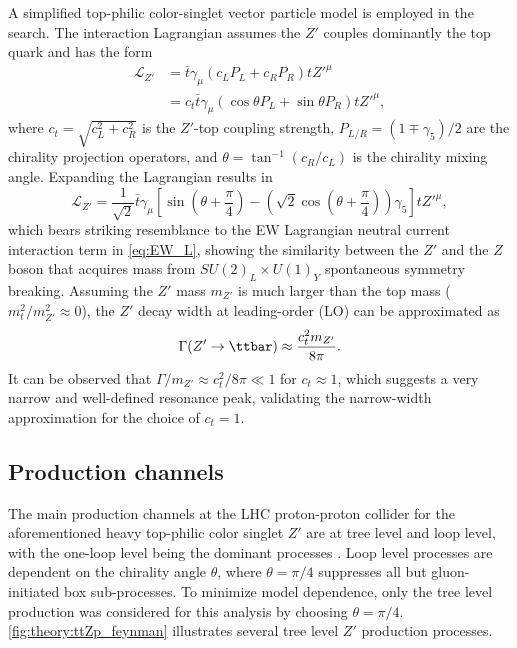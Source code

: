 \documentclass[../thesis.tex]{subfiles}
\begin{document}
A simplified top-philic color-singlet vector particle model \citep{theory:ttZp,theory:ttZp_LHC} is employed in the search. The interaction Lagrangian assumes the $Z'$ couples dominantly the top quark and has the form
\begin{equation}
\begin{aligned}
\mathcal{L}_{Z'} &= \bar{t}\gamma_\mu\left(c_L P_L + c_R P_R\right) tZ'^{\mu}\\
&= c_t \bar{t}\gamma_\mu\left(\cos\theta P_L + \sin\theta P_R\right) tZ'^{\mu},
\end{aligned}
\end{equation}
where $c_t=\sqrt{c_L^2+c_R^2}$ is the $Z'$-top coupling strength, $P_{L/R}=(1\mp \gamma_5)/2$ are the chirality projection operators, and $\theta = \tan^{-1}(c_R/c_L)$ is the chirality mixing angle. Expanding the Lagrangian results in
\begin{equation}
\mathcal{L}_{Z'} = \frac{1}{\sqrt{2}}\bar{t}\gamma_\mu\left[
\sin\left(\theta+\frac{\pi}{4}\right) - \left(\sqrt{2}\cos\left(\theta+\frac{\pi}{4}\right)\right)\gamma_5
\right] tZ'^{\mu},
\end{equation}
which bears striking resemblance to the \acs{EW} Lagrangian neutral current interaction term in \autoref{eq:EW_L}, showing the similarity between the $Z'$ and the $Z$ boson that acquires mass from $SU(2)_L\times U(1)_Y$ spontaneous symmetry breaking. Assuming the $Z'$ mass $m_{Z'}$ is much larger than the top mass ($m_t^2/m_{Z'}^2 \approx 0$), the $Z'$ decay width at leading-order (\acs{LO}) can be approximated as
\begin{equation}
\Gamma(Z' \rightarrow \ttbar) \approx \frac{c_t^2 m_{Z'}}{8\pi}.
\end{equation}
It can be observed that $\Gamma/m_{Z'} \approx c_t^2/8\pi \ll 1$ for $c_t\approx 1$, which suggests a very narrow and well-defined resonance peak, validating the narrow-width approximation for the choice of $c_t=1$.

\subsection{Production channels}

The main production channels at the \acs{LHC} proton-proton collider for the aforementioned heavy top-philic color singlet $Z'$ are at tree level and loop level, with the one-loop level being the dominant processes \citep{theory:ttZp}. Loop level processes are dependent on the chirality angle $\theta$, where $\theta=\pi/4$ suppresses all but gluon-initiated box sub-processes. To minimize model dependence, only the tree level production was considered for this analysis by choosing $\theta=\pi/4$. \autoref{fig:theory:ttZp_feynman} illustrates several tree level $Z'$ production processes.
\end{document}
